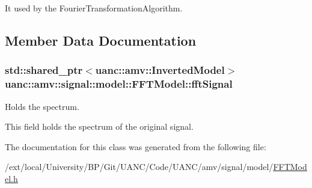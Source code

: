 It used by the Fourier\+Transformation\+Algorithm. 

\subsection{Member Data Documentation}
\subsubsection[{\texorpdfstring{fft\+Signal}{fftSignal}}]{\setlength{\rightskip}{0pt plus 5cm}std\+::shared\+\_\+ptr$<${\bf uanc\+::amv\+::\+Inverted\+Model}$>$ uanc\+::amv\+::signal\+::model\+::\+F\+F\+T\+Model\+::fft\+Signal}\hypertarget{classuanc_1_1amv_1_1signal_1_1model_1_1_f_f_t_model_a1a63228d3c06b13ffb95038823fac3ae}{}\label{classuanc_1_1amv_1_1signal_1_1model_1_1_f_f_t_model_a1a63228d3c06b13ffb95038823fac3ae}


Holds the spectrum. 

This field holds the spectrum of the original signal. 

The documentation for this class was generated from the following file\+:\begin{DoxyCompactItemize}
\item 
/ext/local/\+University/\+B\+P/\+Git/\+U\+A\+N\+C/\+Code/\+U\+A\+N\+C/amv/signal/model/\hyperlink{_f_f_t_model_8h}{F\+F\+T\+Model.\+h}\end{DoxyCompactItemize}
